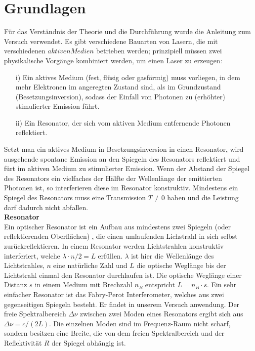\documentclass[a4paper,10pt]{scrartcl} %
\begin{document}
\section{Grundlagen}
\label{sec:Grundlagen}
Für das Verständnis der Theorie und die Durchführung wurde die Anleitung zum Versuch \cite{Anleitung} verwendet.
Es gibt verschiedene Bauarten von Lasern, die mit verschiedenen $aktiven Medien$ betrieben werden; prinzipiell müssen zwei physikalische Vorgänge kombiniert werden, um einen Laser zu erzeugen:
\begin{itemize}
\item[i)] Ein aktives Medium (fest, flüsig oder gasförmig) muss vorliegen, in dem mehr Elektronen im angeregten Zustand sind, als im Grundzustand (Besetzungsinversion), sodass der Einfall von Photonen zu (erhöhter) stimulierter Emission führt.
\item[ii)] Ein Resonator, der sich vom aktiven Medium entfernende Photonen reflektiert.
\end{itemize}
Setzt man ein aktives Medium in Besetzungsinversion in einen Resonator, wird ausgehende spontane Emission an den Spiegeln des Resonators reflektiert und fürt im aktiven Medium zu stimulierter Emission. Wenn der Abstand der Spiegel des Resonators ein vielfaches der Hälfte der Wellenlänge der emittierten Photonen ist, so interferieren diese im Resonator konstruktiv. Mindestens ein Spiegel des Resonators muss eine Transmission $T \neq 0$ haben und die Leistung darf dadurch nicht abfallen.\\
\textbf{Resonator}\\
Ein optischer Resonator ist ein Aufbau aus mindestens zwei Spiegeln (oder reflektierenden Oberflächen) , die einen umlaufenden Lichstrahl in sich selbst zurückreflektieren. In einem Resonator werden Lichtstrahlen konstruktiv interferiert, welche $\lambda \cdot n / 2 = L$ erfüllen. $\lambda$ ist hier die Wellenlänge des Lichtstrahles, $n$ eine natürliche Zahl und $L$ die optische Weglänge bis der Lichtstrahl einmal den Resonator durchlaufen ist. Die optische Weglänge einer Distanz $s$ in einem Medium mit Brechzahl $n_B$ entspricht $L = n_B \cdot s$. Ein sehr einfacher Resonator ist das Fabry-Perot Interferometer, welches aus zwei gegenseitigen Spiegeln besteht. Er findet in unserem Versuch anwendung. Der freie Spektralbereich $\Delta \nu$ zwischen zwei Moden eines Resonators ergibt sich aus $\Delta \nu = c/(2L)$. Die einzelnen Moden sind im Frequenz-Raum nicht scharf, sondern besitzen eine Breite, die von dem freien Spektralbereich und der Reflektivität $R$ der Spiegel abhängig ist.\\
\end{document}
